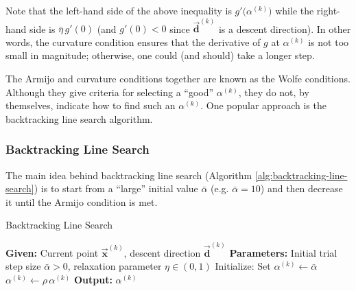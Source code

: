 \documentclass[9pt, headings=standardclasses, parskip=half]{scrartcl}
\renewcommand{\emph}[1]{\textcolor{mypurple}{#1}}
\newcommand{\vect}[1]{\vec{\boldsymbol{#1}}}
\begin{document}
Note that the left-hand side of the above inequality is \(g'\bigl(\alpha^{(k)}\bigr)\) while the right-hand side is \(\bar{\eta}\,g'(0)\) (and \(g'(0) < 0\) since \(\vect{d}^{(k)}\) is a descent direction). In other words, the curvature condition ensures that the derivative of \(g\) at \(\alpha^{(k)}\) is not too small in magnitude; otherwise, one could (and should) take a longer step.

The Armijo and curvature conditions together are known as the \emph{Wolfe conditions}. Although they give criteria for selecting a “good” \(\alpha^{(k)}\), they do not, by themselves, indicate how to find such an \(\alpha^{(k)}\). One popular approach is the backtracking line search algorithm.


\subsubsection{Backtracking Line Search}

The main idea behind backtracking line search (Algorithm \ref{alg:backtracking-line-search}) is to start from a “large” initial value \(\bar{\alpha}\) (e.g. \(\bar{\alpha}=10\)) and then decrease it until the Armijo condition is met.

\begin{algorithm}[h]
\caption{Backtracking Line Search}\label{alg:backtracking-line-search}
\begin{algorithmic}[1]
    \State \textbf{Given:} Current point \(\vect{x}^{(k)}\), descent direction \(\vect{d}^{(k)}\)
    \State \textbf{Parameters:} Initial trial step size \(\bar{\alpha} > 0\), relaxation parameter \(\eta \in (0,1)\)
    \State Initialize: Set \(\alpha^{(k)} \leftarrow \bar{\alpha}\)
        \State \(\alpha^{(k)} \leftarrow \rho\,\alpha^{(k)}\) 
    \EndWhile
    \State \textbf{Output:} \(\alpha^{(k)}\)
\end{algorithmic}
\end{algorithm}
\end{document}
